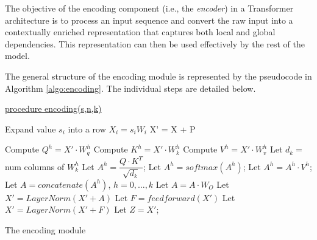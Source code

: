 \documentclass[algorithms,article,submit,pdftex,moreauthors]{Definitions/mdpi}
\begin{document}
The objective of the encoding component (i.e., the \textit{encoder}) in a Transformer architecture is to process an input sequence and convert the raw input into a contextually enriched representation that captures both local and global dependencies. This representation can then be used effectively by the rest of the model.

The general structure of the encoding module is represented by the pseudocode in Algorithm \ref{algo:encoding}. The individual steps are detailed below.

\begin{algorithm2e}

        \underline{procedure encoding(s,n,k)} \label{algo:encoding}
        
        
        {\label{enc:seca1}
            Expand value $s_i$ into a row $X_i = s_iW_i$  
        }   \label{enc:seca2}
        X' = X + P\; \label{enc:positional}
        
	{ \label{enc:encoding-block1}
            {	\label{enc:multihead1}
                Compute $Q^h=X'\cdot W_q^h$\; \label{enc:qh}
                Compute $K^h=X'\cdot W_k^h$\; \label{enc:kh}
                Compute $V^h=X'\cdot W_v^h$\; \label{enc:vh}
                Let $d_k=$ num columns of $W^h_k$\; \label{enc:dk}
                Let $A^h = \dfrac{Q \cdot K^T}{\sqrt{d_k}}$;  \label{enc:attention1}
                Let $A^h = softmax\left(A^h\right)$;  \label{enc:softmax}
                Let $A^h = A^h\cdot V^h$;  \label{enc:attention2}
            } \label{enc:multihead2}
            Let $A=concatenate(A^h)$, $h=0,\dots,k$\; \label{enc:concatenation}
            Let $A = A \cdot W_O$  \; \label{enc:outproj} 
            Let $X' = LayerNorm(X' + A)$\; \label{enc:addnorm1}
            Let $F = feedforward(X')$ \; \label{enc:ffn}
            Let $X' = LayerNorm(X' + F)$\; \label{enc:addnorm2}
        }   \label{enc:encoding-block2}                  
        Let $Z = X'$; \label{enc:output}
	\caption{The encoding module}
\end{algorithm2e}
\end{document}
